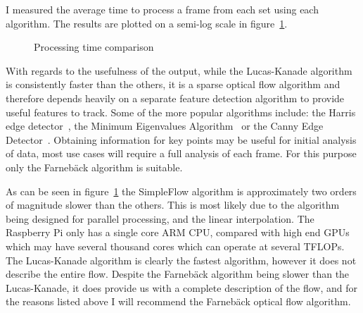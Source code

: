 \documentclass[a4paper,10pt]{article}
\begin{document}
      I measured the average time to process a frame from each set using each algorithm. The results are plotted on a semi-log scale in figure~\ref{fig:realplot}.
    
      \begin{figure}[htbp!]
        \centering
        \caption{Processing time comparison}
        \label{fig:realplot}
      \end{figure}
      
      With regards to the usefulness of the output, while the Lucas-Kanade algorithm is consistently faster than the others, it is a sparse optical flow algorithm and therefore depends heavily on a separate feature detection algorithm to provide useful features to track. Some of the more popular algorithms include: the Harris edge detector~\cite{harris1988combined}, the Minimum Eigenvalues Algorithm~\cite{shi1994good} or the Canny Edge Detector~\cite{canny1986computational}. Obtaining information for key points may be useful for initial analysis of data, most use cases will require a full analysis of each frame. For this purpose only the Farnebäck algorithm is suitable.
      
      As can be seen in figure~\ref{fig:realplot} the SimpleFlow algorithm is approximately two orders of magnitude slower than the others. This is most likely due to the algorithm being designed for parallel processing, and the linear interpolation. The Raspberry Pi only has a single core ARM CPU, compared with high end GPUs which may have several thousand cores which can operate at several TFLOPs. The Lucas-Kanade algorithm is clearly the fastest algorithm, however it does not describe the entire flow. Despite the Farnebäck algorithm being slower than the Lucas-Kanade, it does provide us with a complete description of the flow, and for the reasons listed above I will recommend the Farnebäck optical flow algorithm.
      
\end{document}
